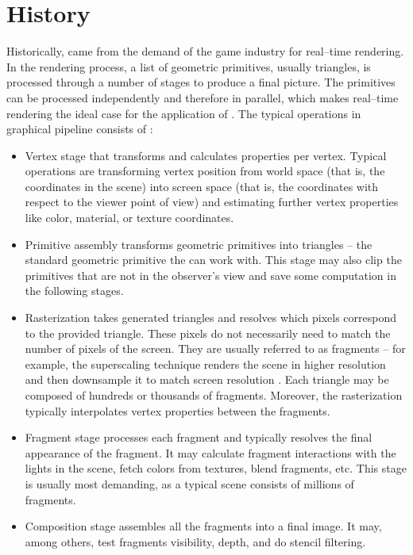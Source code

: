 \section{History}

Historically, \gpu came from the demand of the game industry for real--time rendering. In the rendering process, a list of geometric primitives, usually triangles, is processed through a number of stages to produce a final picture. The primitives can be processed independently and therefore in parallel, which makes real--time rendering the ideal case for the application of \gpuns. The typical operations in graphical pipeline consists of \citep{GPUComputingOwens}:
\begin{itemize}
    \item Vertex stage that transforms and calculates properties per vertex. Typical operations are transforming vertex position from world space (that is, the coordinates in the scene) into screen space (that is, the coordinates with respect to the viewer point of view) and estimating further vertex properties like color, material, or texture coordinates.
    \item Primitive assembly transforms geometric primitives into triangles -- the standard geometric primitive the \gpu can work with. This stage may also clip the primitives that are not in the observer's view and save some computation in the following stages.
    \item Rasterization takes generated triangles and resolves which pixels correspond to the provided triangle. These pixels do not necessarily need to match the number of pixels of the screen. They are usually referred to as fragments -- for example, the superscaling technique renders the scene in higher resolution and then downsample it to match screen resolution \citep{GameGraphicProgramming}. Each triangle may be composed of hundreds or thousands of fragments. Moreover, the rasterization typically interpolates vertex properties between the fragments.
    \item Fragment stage processes each fragment and typically resolves the final appearance of the fragment. It may calculate fragment interactions with the lights in the scene, fetch colors from textures, blend fragments, etc. This stage is usually most demanding, as a typical scene consists of millions of fragments.
    \item Composition stage assembles all the fragments into a final image. It may, among others, test fragments visibility, depth, and do stencil filtering.
\end{itemize}

